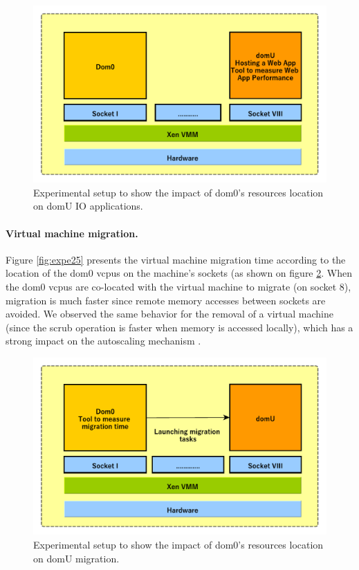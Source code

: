 \begin{figure}[!h]
\centering
\includegraphics[scale=0.65]{fig03/expe6.pdf}
\caption{Experimental setup to show the impact of dom0's resources location on domU IO applications.}
\label{fig:expe6}
\end{figure}

\paragraph{Virtual machine migration.} Figure \ref{fig:expe25} presents the virtual machine migration time according to the location of the dom0 \acrshort{vcpu}s on the machine's sockets (as shown on figure \ref{fig:expe5}. When the dom0 \acrshort{vcpu}s are co-located with the virtual machine to migrate (on socket 8), migration is much faster since remote memory accesses between sockets are avoided. We observed the same behavior for the removal of a virtual machine (since the scrub operation is faster when memory is accessed locally), which has a strong impact on the autoscaling mechanism \citep{work03}.


\begin{figure}[!h]
\centering
\includegraphics[scale=0.60]{fig03/expe5.pdf}
\caption{Experimental setup to show the impact of dom0's resources location on domU migration.}
\label{fig:expe5}
\end{figure}

